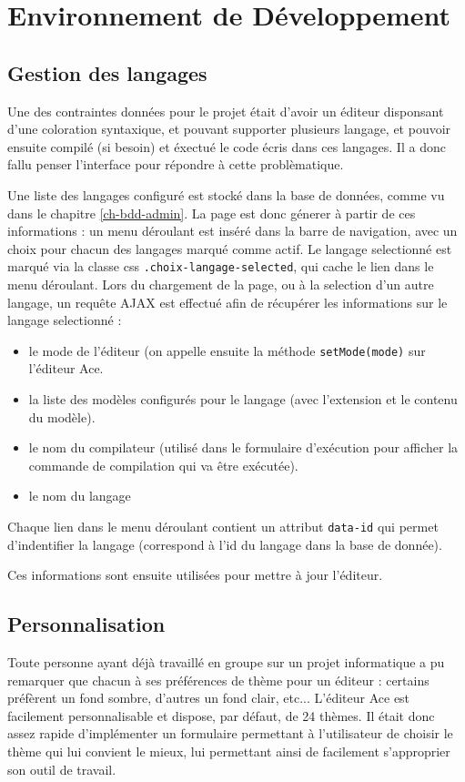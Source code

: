 \section{Environnement de Développement}

\subsection{Gestion des langages}

Une des contraintes données pour le projet était d'avoir un éditeur disponsant d'une coloration syntaxique, et pouvant supporter plusieurs langage, et pouvoir ensuite compilé (si besoin) et éxectué le code écris dans ces langages. Il a donc fallu penser l'interface pour répondre à cette problèmatique.

Une liste des langages configuré est stocké dans la base de données, comme vu dans le chapitre \ref{ch-bdd-admin}. La page est donc génerer à partir de ces informations : un menu déroulant est inséré dans la barre de navigation, avec un choix pour chacun des langages marqué comme actif. Le langage selectionné est marqué via la classe css \texttt{.choix-langage-selected}, qui cache le lien dans le menu déroulant. Lors du chargement de la page, ou à la selection d'un autre langage, un requête AJAX est effectué afin de récupérer les informations sur le langage selectionné :
\begin{itemize}
  \item le mode de l'éditeur (on appelle ensuite la méthode \texttt{setMode(mode)} sur l'éditeur Ace.
  \item la liste des modèles configurés pour le langage (avec l'extension et le contenu du modèle).
  \item le nom du compilateur (utilisé dans le formulaire d'exécution pour afficher la commande de compilation qui va être exécutée).
  \item le nom du langage
\end{itemize}
Chaque lien dans le menu déroulant contient un attribut \texttt{data-id} qui permet d'indentifier la langage (correspond à l'id du langage dans la base de donnée).

Ces informations sont ensuite utilisées pour mettre à jour l'éditeur.

\subsection{Personnalisation}

Toute personne ayant déjà travaillé en groupe sur un projet informatique a pu remarquer que chacun à ses préférences de thème pour un éditeur : certains préfèrent un fond sombre, d'autres un fond clair, etc... L'éditeur Ace est facilement personnalisable et dispose, par défaut, de 24 thèmes. Il était donc assez rapide d'implémenter un formulaire permettant à l'utilisateur de choisir le thème qui lui convient le mieux, lui permettant ainsi de facilement s'approprier son outil de travail.

